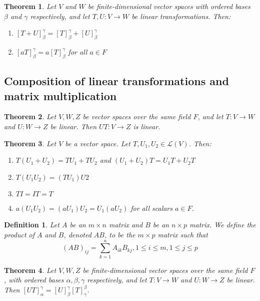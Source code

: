 \documentclass[a4paper]{article}
\newtheorem{mytheorem}{Theorem}
\newtheorem{mydef}{Definition}
\numberwithin{mytheorem}{section}
\numberwithin{mydef}{section}
\numberwithin{example}{section}
\begin{document}
\begin{mytheorem}Let $V$ and $W$ be finite-dimensional vector spaces with ordered bases $\beta$ and $\gamma$ respectively, and let $T,U: V \rightarrow W$ be linear transformations. Then:
\begin{enumerate} 
\item $[T+U]^{\gamma}_{\beta} = [T]^{\gamma}_{\beta} + [U]^{\gamma}_{\beta}$
\item $[aT]^{\gamma}_{\beta} = a[T]^{\gamma}_{\beta}$ for all $a \in F$
\end{enumerate}
\end{mytheorem}

\subsection{Composition of linear transformations and matrix multiplication}

\begin{mytheorem}Let $V,W,Z$ be vector spaces over the same field $F$, and let $T: V \rightarrow W$ and $U: W \rightarrow Z$ be linear. Then $UT: V \rightarrow Z$ is linear. 
\end{mytheorem}

\begin{mytheorem}Let $V$ be a vector space. Let $T,U_{1},U_{2} \in \mathcal{L}(V)$. Then:
\begin{enumerate} 
\item $T(U_{1}+U_{2}) = TU_{1} + TU_{2}$ and $(U_{1}+U_{2})T = U_{1}T + U_{2}T$
\item $T(U_{1}U_{2}) = (TU_{1})U{2}$
\item $TI = IT = T$
\item $a(U_{1}U_{2}) = (aU_{1})U_{2} = U_{1}(aU_{2})$ for all scalars $a \in F$.
\end{enumerate}
\end{mytheorem}

\begin{mydef}  Let $A$ be an $m \times n$ matrix and $B$ be an $n \times p$ matrix. We define the product of $A$ and $B$, denoted $AB$, to be the $m \times p$ matrix such that $$(AB)_{ij} = \sum^{n}_{k = 1}A_{ik}B_{kj}, 1 \leq i \leq m, 1 \leq j \leq p$$
\end{mydef}

\begin{mytheorem}Let $V,W,Z$ be finite-dimensional vector spaces over the same field $F$, with ordered bases $\alpha,\beta,\gamma$ respectively, and let $T: V \rightarrow W$ and $U: W \rightarrow Z$ be linear. Then $[UT]^{\gamma}_{\alpha} = [U]^{\gamma}_{\beta}[T]^{\beta}_{\gamma}$. 
\end{mytheorem}
\end{document}

